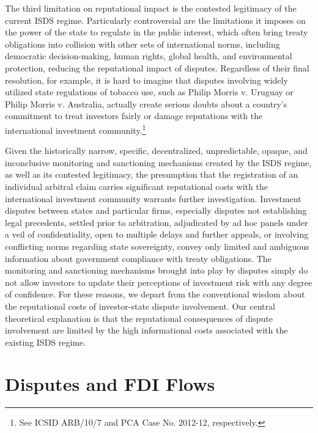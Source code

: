 \documentclass[12pt,onesided]{amsart}
\begin{document}
The third limitation on reputational impact is the contested legitimacy of the current ISDS regime. Particularly controversial are the limitations it imposes on the power of the state to regulate in the public interest, which often bring treaty obligations into collision with other sets of international norms, including democratic decision-making, human rights, global health, and environmental protection, reducing the reputational impact of disputes. Regardless of their final resolution, for example, it is hard to imagine that disputes involving widely utilized state regulations of tobacco use, such as Philip Morris v. Uruguay or Philip Morris v. Australia, actually create serious doubts about a country's commitment to treat investors fairly or damage reputations with the international investment community.\footnote{See ICSID ARB/10/7 and PCA Case No. 2012-12, respectively.} 

Given the historically narrow, specific, decentralized, unpredictable, opaque, and inconclusive  monitoring and sanctioning mechanisms created by the ISDS regime, as well as its contested legitimacy, the presumption that the registration of an individual arbitral claim carries significant reputational costs with the international investment community warrants further investigation. Investment disputes between states and particular firms, especially disputes not establishing legal precedents, settled prior to arbitration, adjudicated by ad hoc panels under a veil of confidentiality, open to multiple delays and further appeals, or involving conflicting norms regarding state sovereignty, convey only limited and ambiguous information about government compliance with treaty obligations. The monitoring and sanctioning mechanisms brought into play by disputes simply do not allow investors to update their perceptions of investment risk with any degree of confidence. For these reasons, we depart from the conventional wisdom about the reputational costs of investor-state dispute involvement. Our central theoretical explanation is that the reputational consequences of dispute involvement are limited by the high informational costs associated with the existing ISDS regime. 

\section*{Disputes and FDI Flows}
\end{document}
